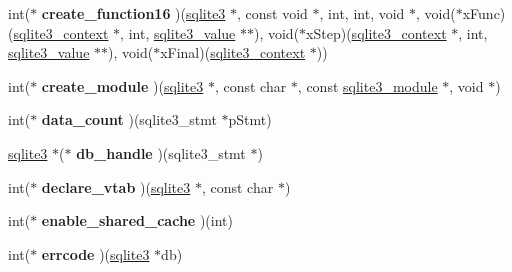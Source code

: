 \begin{DoxyCompactItemize}
\item 
int($\ast$ {\bfseries create\+\_\+function16} )(\hyperlink{structsqlite3}{sqlite3} $\ast$, const void $\ast$, int, int, void $\ast$, void($\ast$x\+Func)(\hyperlink{structsqlite3__context}{sqlite3\+\_\+context} $\ast$, int, \hyperlink{structMem}{sqlite3\+\_\+value} $\ast$$\ast$), void($\ast$x\+Step)(\hyperlink{structsqlite3__context}{sqlite3\+\_\+context} $\ast$, int, \hyperlink{structMem}{sqlite3\+\_\+value} $\ast$$\ast$), void($\ast$x\+Final)(\hyperlink{structsqlite3__context}{sqlite3\+\_\+context} $\ast$))\hypertarget{structsqlite3__api__routines_a0c3f05b118b89293ff5d35774504b44d}{}\label{structsqlite3__api__routines_a0c3f05b118b89293ff5d35774504b44d}

\item 
int($\ast$ {\bfseries create\+\_\+module} )(\hyperlink{structsqlite3}{sqlite3} $\ast$, const char $\ast$, const \hyperlink{structsqlite3__module}{sqlite3\+\_\+module} $\ast$, void $\ast$)\hypertarget{structsqlite3__api__routines_a25834b37191417562ecd2ee67b85617b}{}\label{structsqlite3__api__routines_a25834b37191417562ecd2ee67b85617b}

\item 
int($\ast$ {\bfseries data\+\_\+count} )(sqlite3\+\_\+stmt $\ast$p\+Stmt)\hypertarget{structsqlite3__api__routines_aea0a7b7483770202ef9eae88b4eb70cd}{}\label{structsqlite3__api__routines_aea0a7b7483770202ef9eae88b4eb70cd}

\item 
\hyperlink{structsqlite3}{sqlite3} $\ast$($\ast$ {\bfseries db\+\_\+handle} )(sqlite3\+\_\+stmt $\ast$)\hypertarget{structsqlite3__api__routines_ab0133d05f54efba67f6172538ca25ae0}{}\label{structsqlite3__api__routines_ab0133d05f54efba67f6172538ca25ae0}

\item 
int($\ast$ {\bfseries declare\+\_\+vtab} )(\hyperlink{structsqlite3}{sqlite3} $\ast$, const char $\ast$)\hypertarget{structsqlite3__api__routines_a6b6035b36ea9d0800181e69e20059b32}{}\label{structsqlite3__api__routines_a6b6035b36ea9d0800181e69e20059b32}

\item 
int($\ast$ {\bfseries enable\+\_\+shared\+\_\+cache} )(int)\hypertarget{structsqlite3__api__routines_a3e6b7bbdd68cde43ef4afffd73e957ea}{}\label{structsqlite3__api__routines_a3e6b7bbdd68cde43ef4afffd73e957ea}

\item 
int($\ast$ {\bfseries errcode} )(\hyperlink{structsqlite3}{sqlite3} $\ast$db)\hypertarget{structsqlite3__api__routines_a0f1cf42108e6d872d03b78eaf27dfc45}{}\label{structsqlite3__api__routines_a0f1cf42108e6d872d03b78eaf27dfc45}


\end{DoxyCompactItemize}
